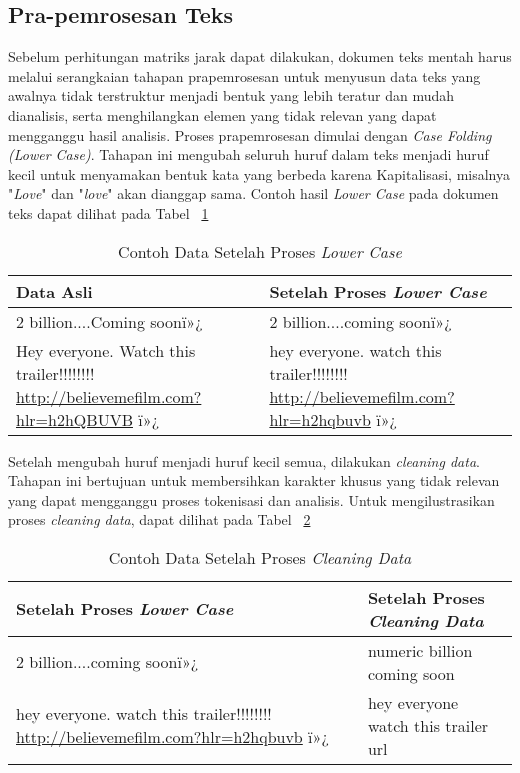 \documentclass[a4paper,12pt]{report}
\numberwithin{equation}{chapter}
\begin{document}
\subsection{Pra-pemrosesan Teks}
Sebelum perhitungan matriks jarak dapat dilakukan, dokumen teks mentah harus melalui serangkaian tahapan prapemrosesan untuk menyusun data teks yang awalnya tidak terstruktur menjadi bentuk yang lebih teratur dan mudah dianalisis, serta menghilangkan elemen yang tidak relevan yang dapat mengganggu hasil analisis. Proses prapemrosesan dimulai dengan \textit{Case Folding (Lower Case)}. Tahapan ini mengubah seluruh huruf dalam teks menjadi huruf kecil untuk menyamakan bentuk kata yang berbeda karena Kapitalisasi, misalnya "\textit{Love}" dan "\textit{love}" akan dianggap sama. Contoh hasil \textit{Lower Case} pada dokumen teks dapat dilihat pada Tabel ~\ref{tab:lowercase} 

\begin{table}[h!]
\centering
\caption{Contoh Data Setelah Proses \textit{Lower Case}}
\label{tab:lowercase}
\begin{tabularx}{\textwidth}{|X|X|}
\hline
\textbf{Data Asli} & \textbf{Setelah Proses \textit{Lower Case}} \\
\hline
2 billion....Coming soonï»¿ & 2 billion....coming soonï»¿ \\
\hline
Hey everyone. Watch this trailer!!!!!!!! \url{http://believemefilm.com?hlr=h2hQBUVB} ï»¿
& 
hey everyone. watch this trailer!!!!!!!! \url{http://believemefilm.com?hlr=h2hqbuvb} ï»¿
\\
\hline
\end{tabularx}
\end{table}

Setelah mengubah huruf menjadi huruf kecil semua, dilakukan \textit{cleaning data}. Tahapan ini bertujuan untuk membersihkan karakter khusus yang tidak relevan  yang dapat mengganggu proses tokenisasi dan analisis. Untuk mengilustrasikan proses \textit{cleaning data}, dapat dilihat pada Tabel ~\ref{tab:cleaningdata}


\begin{table}[h!]
\centering
\caption{Contoh Data Setelah Proses \textit{Cleaning Data}}
\label{tab:cleaningdata}
\begin{tabularx}{\textwidth}{|X|X|}
\hline
\textbf{Setelah Proses \textit{Lower Case}} & \textbf{Setelah Proses \textit{Cleaning Data}} \\
\hline
2 billion....coming soonï»¿
 & 
numeric billion coming soon
\\
\hline
hey everyone. watch this trailer!!!!!!!! \url{http://believemefilm.com?hlr=h2hqbuvb} ï»¿
& 
hey everyone watch this trailer url
 \\
\hline
\end{tabularx}
\end{table}
\end{document}
